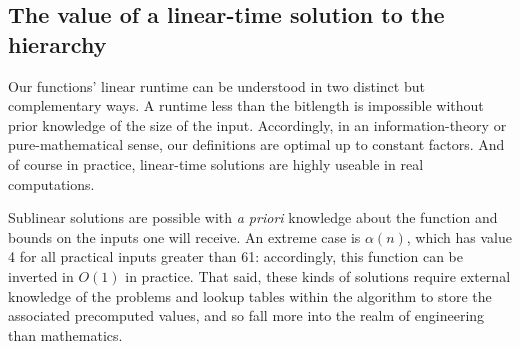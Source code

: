 \newcommand{\ackt}{\ensuremath{\hat{\alpha}}}

\subsection{The value of a linear-time solution to the hierarchy}

Our functions' linear runtime can be understood in two distinct but
complementary ways.  A runtime less than the bitlength is impossible
without prior knowledge of the size of the input.  Accordingly, in
an information-theory or pure-mathematical sense, our definitions are
optimal up to constant factors.  And of course in practice, linear-time
solutions are highly useable in real computations.

Sublinear solutions are possible with \emph{a priori} knowledge about
the function and bounds on the inputs one will receive.
An extreme case is $\alpha(n)$, which has value 4 for all practical
inputs greater than 61: accordingly,
this function can be inverted in $O(1)$ in practice.  That said, these
kinds of solutions require external knowledge of the problems and
lookup tables within the algorithm to store the associated precomputed
values, and so fall more into the realm of engineering than mathematics. 

